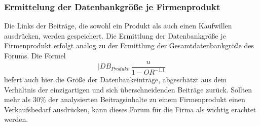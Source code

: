 \subsubsection{Ermittelung der Datenbankgröße je Firmenprodukt}
Die Links der Beiträge, die sowohl ein Produkt als auch einen Kaufwillen ausdrücken, werden gespeichert. Die Ermittlung der Datenbankgröße je Firmenprodukt erfolgt analog zu der Ermittlung der Gesamtdatenbankgröße des Forums. Die Formel \[|DB_{Produkt}|\frac{u}{1-OR^{-1.1}}\] \cite{lu2008efficient} liefert auch hier die Größe der Datenbankeinträge, abgeschätzt aus dem Verhältnis der einzigartigen und sich überschneidenden Beiträge zurück.
Sollten mehr als 30\% der analysierten Beitragsinhalte zu einem Firmenprodukt einen Verkaufsbedarf ausdrücken, kann dieses Forum für die Firma als wichtig erachtet werden.
